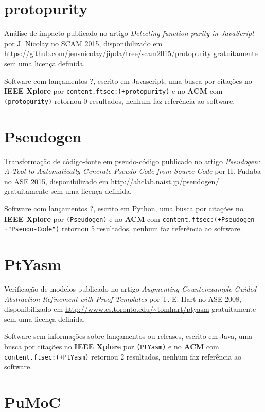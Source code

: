 \section{protopurity}

Análise de impacto
publicado no artigo {\it Detecting function purity in JavaScript}
por J. Nicolay
no SCAM 2015,
disponibilizado em \url{https://github.com/jensnicolay/jipda/tree/scam2015/protopurity}
gratuitamente
sem uma licença definida.

Software com lançamentos ?,
escrito em Javascript,
uma busca por citações no {\bf IEEE Xplore} por
\texttt{content.ftsec:(+protopurity)}
e no {\bf ACM} com
\texttt{(protopurity)}
retornou
0 resultados,
nenhum faz referência ao software.



\section{Pseudogen}

Transformação de código-fonte em pseudo-código
publicado no artigo {\it Pseudogen: A Tool to Automatically Generate Pseudo-Code from Source Code}
por H. Fudaba
no ASE 2015,
disponibilizado em \url{http://ahclab.naist.jp/pseudogen/}
gratuitamente
sem uma licença definida.

Software com lançamentos ?,
escrito em Python,
uma busca por citações no {\bf IEEE Xplore} por
\texttt{(Pseudogen)}
e no {\bf ACM} com
\texttt{content.ftsec:(+Pseudogen +"Pseudo-Code")}
retornou
5 resultados,
nenhum faz referência ao software.



\section{PtYasm}

Verificação de modelos
publicado no artigo {\it Augmenting Counterexample-Guided Abstraction Refinement with Proof Templates}
por T. E. Hart
no ASE 2008,
disponibilizado em \url{http://www.cs.toronto.edu/~tomhart/ptyasm}
gratuitamente
sem uma licença definida.

Software sem informações sobre lançamentos ou releases,
escrito em Java,
uma busca por citações no {\bf IEEE Xplore} por
\texttt{(PtYasm)}
e no {\bf ACM} com
\texttt{content.ftsec:(+PtYasm)}
retornou
2 resultados,
nenhum faz referência ao software.



\section{PuMoC}

